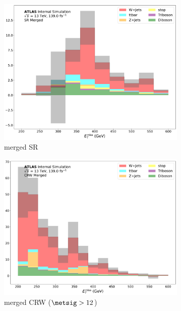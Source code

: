  \begin{figure}[htbp]
    \begin{subfigure}[t]{0.48\textwidth}
    \centering
     \includegraphics[width = 0.99\textwidth]{Figures/App_SR_CR_distributions/SR1L_Merged/MetTST_met_N_1.pdf}
    \caption{merged SR}
    \end{subfigure}
    \begin{subfigure}[t]{0.48\textwidth}
    \centering
     \includegraphics[width = 0.99\textwidth]{Figures/App_SR_CR_distributions/CRW_Merged/MetTST_met_N_1.pdf}
    \caption{merged CRW (\(\metsig>12\))}
    \end{subfigure}
    \begin{subfigure}[t]{\textwidth}

\end{subfigure}
\end{figure}
